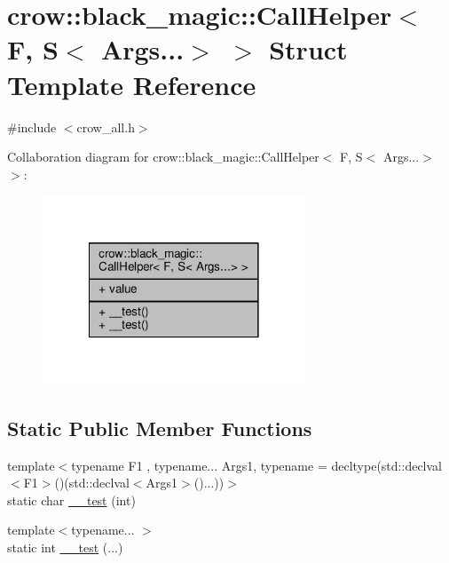 \hypertarget{structcrow_1_1black__magic_1_1_call_helper_3_01_f_00_01_s_3_01_args_8_8_8_4_01_4}{\section{crow\-:\-:black\-\_\-magic\-:\-:Call\-Helper$<$ F, S$<$ Args...$>$ $>$ Struct Template Reference}
\label{structcrow_1_1black__magic_1_1_call_helper_3_01_f_00_01_s_3_01_args_8_8_8_4_01_4}
}


{\ttfamily \#include $<$crow\-\_\-all.\-h$>$}



Collaboration diagram for crow\-:\-:black\-\_\-magic\-:\-:Call\-Helper$<$ F, S$<$ Args...$>$ $>$\-:
\nopagebreak
\begin{figure}[H]
\begin{center}
\leavevmode
\includegraphics[width=222pt]{structcrow_1_1black__magic_1_1_call_helper_3_01_f_00_01_s_3_01_args_8_8_8_4_01_4__coll__graph}
\end{center}
\end{figure}
\subsection*{Static Public Member Functions}
\begin{DoxyCompactItemize}
\item 
{\footnotesize template$<$typename F1 , typename... Args1, typename  = decltype(std\-::declval$<$\-F1$>$()(std\-::declval$<$\-Args1$>$()...))$>$ }\\static char \hyperlink{structcrow_1_1black__magic_1_1_call_helper_3_01_f_00_01_s_3_01_args_8_8_8_4_01_4_a06879edc3372c43c8ad51ca05a2870b8}{\-\_\-\-\_\-test} (int)
\item 
{\footnotesize template$<$typename... $>$ }\\static int \hyperlink{structcrow_1_1black__magic_1_1_call_helper_3_01_f_00_01_s_3_01_args_8_8_8_4_01_4_a52e2300a0ca9fc87fc3dbdd3c7baf172}{\-\_\-\-\_\-test} (...)
\end{DoxyCompactItemize}
